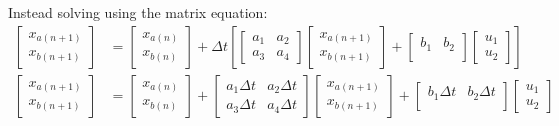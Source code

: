 \documentclass[11pt]{article}
\begin{document}
Instead solving using the matrix equation:
\begin{subequations}
  \begin{align}
    \begin{bmatrix}
      x_{a(n+1)} \\
      x_{b(n+1)}
    \end{bmatrix} &=
    \begin{bmatrix}
      x_{a(n)} \\
      x_{b(n)}
    \end{bmatrix} +
    \Delta t \left[
    \begin{bmatrix}
      a_1 & a_2 \\
      a_3 & a_4
    \end{bmatrix}
    \begin{bmatrix}
      x_{a(n+1)} \\
      x_{b(n+1)}
    \end{bmatrix} +
    \begin{bmatrix}
      b_1 & b_2 \\
    \end{bmatrix}
    \begin{bmatrix}
      u_1 \\
      u_2
    \end{bmatrix}
    \right] \\
    \begin{bmatrix}
      x_{a(n+1)} \\
      x_{b(n+1)}
    \end{bmatrix} &=
    \begin{bmatrix}
      x_{a(n)} \\
      x_{b(n)}
    \end{bmatrix} +
    \begin{bmatrix}
      a_1\Delta t & a_2\Delta t \\
      a_3\Delta t & a_4\Delta t
    \end{bmatrix}
    \begin{bmatrix}
      x_{a(n+1)} \\
      x_{b(n+1)}
    \end{bmatrix} +
    \begin{bmatrix}
      b_1\Delta t & b_2\Delta t \\
    \end{bmatrix}
    \begin{bmatrix}
      u_1 \\
      u_2
    \end{bmatrix} \\

\end{align}
\end{subequations}
\end{document}
